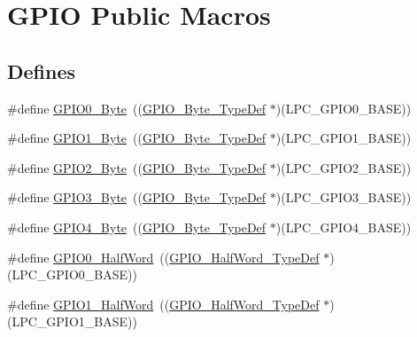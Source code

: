 \hypertarget{group___g_p_i_o___public___macros}{\section{\-G\-P\-I\-O \-Public \-Macros}
\label{group___g_p_i_o___public___macros}
}
\subsection*{\-Defines}
\begin{DoxyCompactItemize}
\item 
\#define \hyperlink{group___g_p_i_o___public___macros_ga283f46328b525142110cfd3d8a905b4b}{\-G\-P\-I\-O0\-\_\-\-Byte}~((\hyperlink{struct_g_p_i_o___byte___type_def}{\-G\-P\-I\-O\-\_\-\-Byte\-\_\-\-Type\-Def} $\ast$)(\-L\-P\-C\-\_\-\-G\-P\-I\-O0\-\_\-\-B\-A\-S\-E))
\item 
\#define \hyperlink{group___g_p_i_o___public___macros_ga06af9dfab07e8c2a5f1a6db198896e84}{\-G\-P\-I\-O1\-\_\-\-Byte}~((\hyperlink{struct_g_p_i_o___byte___type_def}{\-G\-P\-I\-O\-\_\-\-Byte\-\_\-\-Type\-Def} $\ast$)(\-L\-P\-C\-\_\-\-G\-P\-I\-O1\-\_\-\-B\-A\-S\-E))
\item 
\#define \hyperlink{group___g_p_i_o___public___macros_ga047ebf1e19ebfdd3abf05ba23491fa05}{\-G\-P\-I\-O2\-\_\-\-Byte}~((\hyperlink{struct_g_p_i_o___byte___type_def}{\-G\-P\-I\-O\-\_\-\-Byte\-\_\-\-Type\-Def} $\ast$)(\-L\-P\-C\-\_\-\-G\-P\-I\-O2\-\_\-\-B\-A\-S\-E))
\item 
\#define \hyperlink{group___g_p_i_o___public___macros_ga51a2f5fc99e06509aabe77fef292503b}{\-G\-P\-I\-O3\-\_\-\-Byte}~((\hyperlink{struct_g_p_i_o___byte___type_def}{\-G\-P\-I\-O\-\_\-\-Byte\-\_\-\-Type\-Def} $\ast$)(\-L\-P\-C\-\_\-\-G\-P\-I\-O3\-\_\-\-B\-A\-S\-E))
\item 
\#define \hyperlink{group___g_p_i_o___public___macros_ga528428e2906cb32a40f0e62a559f3814}{\-G\-P\-I\-O4\-\_\-\-Byte}~((\hyperlink{struct_g_p_i_o___byte___type_def}{\-G\-P\-I\-O\-\_\-\-Byte\-\_\-\-Type\-Def} $\ast$)(\-L\-P\-C\-\_\-\-G\-P\-I\-O4\-\_\-\-B\-A\-S\-E))
\item 
\#define \hyperlink{group___g_p_i_o___public___macros_ga1ff064a592c57da00124bb63736c4125}{\-G\-P\-I\-O0\-\_\-\-Half\-Word}~((\hyperlink{struct_g_p_i_o___half_word___type_def}{\-G\-P\-I\-O\-\_\-\-Half\-Word\-\_\-\-Type\-Def} $\ast$)(\-L\-P\-C\-\_\-\-G\-P\-I\-O0\-\_\-\-B\-A\-S\-E))
\item 
\#define \hyperlink{group___g_p_i_o___public___macros_gaa0c96e5acb3905bd46033e49b0c0c2c2}{\-G\-P\-I\-O1\-\_\-\-Half\-Word}~((\hyperlink{struct_g_p_i_o___half_word___type_def}{\-G\-P\-I\-O\-\_\-\-Half\-Word\-\_\-\-Type\-Def} $\ast$)(\-L\-P\-C\-\_\-\-G\-P\-I\-O1\-\_\-\-B\-A\-S\-E))

\end{DoxyCompactItemize}

